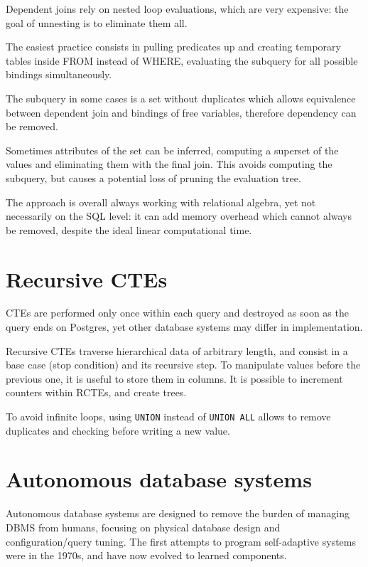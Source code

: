 Dependent joins rely on nested loop evaluations, which are very expensive: the goal of unnesting is to eliminate them all.

The easiest practice consists in pulling predicates up and creating temporary tables inside FROM instead of WHERE, evaluating the subquery for all possible bindings simultaneously. 

The subquery in some cases is a set without duplicates which allows equivalence between dependent join and bindings of free variables, therefore dependency can be removed.

Sometimes attributes of the set can be inferred, computing a superset of the values and eliminating them with the final join. This avoids computing the subquery, but causes a potential loss of pruning the evaluation tree.

The approach is overall always working with relational algebra, yet not necessarily on the SQL level: it can add memory overhead which cannot always be removed, despite the ideal linear computational time.

\section{Recursive CTEs}
CTEs are performed only once within each query and destroyed as soon as the query ends on Postgres, yet other database systems may differ in implementation. 

Recursive CTEs traverse hierarchical data of arbitrary length, and consist in a base case (stop condition) and its recursive step. To manipulate values before the previous one, it is useful to store them in columns. It is possible to increment counters within RCTEs, and create trees. 

To avoid infinite loops, using \texttt{UNION} instead of \texttt{UNION ALL} allows to remove duplicates and checking before writing a new value.






\section{Autonomous database systems}
Autonomous database systems are designed to remove the burden of managing DBMS from humans, focusing on physical database design and configuration/query tuning. The first attempts to program self-adaptive systems were in the 1970s, and have now evolved to learned components. 

